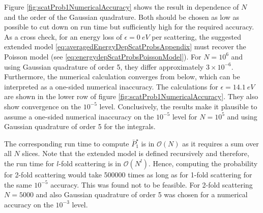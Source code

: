 Figure \ref{fig:scatProb1NumericalAccuracy} shows the result in dependence of $N$ and the order of the Gaussian quadrature. Both should be chosen as low as possible to cut down on run time but sufficiently high for the required accuracy. As a cross check, for an energy loss of $\epsilon=\SI{0}{eV}$ per scattering, the suggested extended model \eqref{eq:averagedEnergyDepScatProbsAppendix} must recover the Poisson model (see \eqref{eq:energydepScatProbsPoissonModel}). For $N=10^6$ and using Gaussian quadrature of order 5, they differ approximately $3\times10^{-6}$. Furthermore, the numerical calculation converges from below, which can be interpreted as a one-sided numerical inaccuracy. The calculations for $\epsilon=\SI{14.1}{eV}$ are shown in the lower row of figure \ref{fig:scatProb1NumericalAccuracy}. They also show convergence on the $10^{-5}$ level. Conclusively, the results make it plausible to assume a one-sided numerical inaccuracy on the $10^{-5}$ level for $N=10^5$ and using Gaussian quadrature of order 5 for the integrals.

The corresponding run time to compute $\bar{P}^{\star}_1$ is in $\mathcal{O}(N)$ as it requires a sum over all $N$ slices. Note that the extended model is defined recursively and therefore, the run time for $l$-fold scattering is in $\mathcal{O}(N^l)$. Hence, computing the probability for 2-fold scattering would take 500000 times as long as for 1-fold scattering for the same $10^{-5}$ accuracy. This was found not to be feasible. For 2-fold scattering $N=5000$ and also Gaussian quadrature of order 5 was chosen for a numerical accuracy on the $10^{-3}$ level.
\FloatBarrier